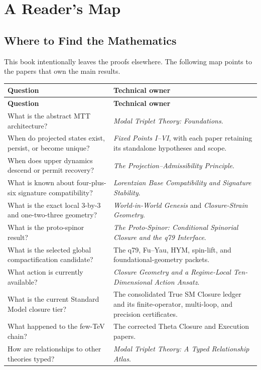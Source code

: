 \documentclass[11pt,openany]{book}
\begin{document}
\part{A Reader's Map}

\chapter{Where to Find the Mathematics}

This book intentionally leaves the proofs elsewhere. The following map points
to the papers that own the main results.

\begingroup
\small
\begin{longtable}{L{0.27\textwidth}L{0.59\textwidth}}
\textbf{Question} & \textbf{Technical owner}\\\hline
\endfirsthead
\textbf{Question} & \textbf{Technical owner}\\\hline
\endhead
What is the abstract MTT architecture? &
\emph{Modal Triplet Theory: Foundations}.\\
When do projected states exist, persist, or become unique? &
\emph{Fixed Points I--VI}, with each paper retaining its standalone
hypotheses and scope.\\
When does upper dynamics descend or permit recovery? &
\emph{The Projection--Admissibility Principle}.\\
What is known about four-plus-six signature compatibility? &
\emph{Lorentzian Base Compatibility and Signature Stability}.\\
What is the exact local $3$-by-$3$ and one-two-three geometry? &
\emph{World-in-World Genesis} and \emph{Closure-Strain Geometry}.\\
What is the proto-spinor result? &
\emph{The Proto-Spinor: Conditional Spinorial Closure and the q79
Interface}.\\
What is the selected global compactification candidate? &
The q79, Fu--Yau, HYM, spin-lift, and foundational-geometry packets.\\
What action is currently available? &
\emph{Closure Geometry and a Regime-Local Ten-Dimensional Action Ansatz}.\\
What is the current Standard Model closure tier? &
The consolidated True SM Closure ledger and its finite-operator,
multi-loop, and precision certificates.\\
What happened to the few-TeV chain? &
The corrected Theta Closure and Execution papers.\\
How are relationships to other theories typed? &
\emph{Modal Triplet Theory: A Typed Relationship Atlas}.\\
\end{longtable}
\endgroup
\end{document}
